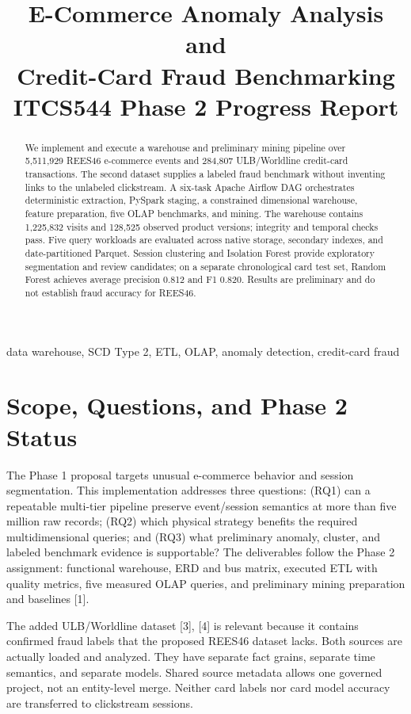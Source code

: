 \documentclass[conference]{IEEEtran}
\title{E-Commerce Anomaly Analysis and\\Credit-Card Fraud Benchmarking\\\large ITCS544 Phase 2 Progress Report}
\author{\IEEEauthorblockN{Khon Cho Thar Byin (6837922), Chuchan Ou (6836902), Aye Myo Myat (6837919)}\IEEEauthorblockA{Faculty of Information and Communication Technology, Mahidol University\\12 October 2026}}
\begin{document}
\maketitle
\begin{abstract}
We implement and execute a warehouse and preliminary mining pipeline over 5,511,929 REES46 e-commerce events and 284,807 ULB/Worldline credit-card transactions. The second dataset supplies a labeled fraud benchmark without inventing links to the unlabeled clickstream. A six-task Apache Airflow DAG orchestrates deterministic extraction, PySpark staging, a constrained dimensional warehouse, feature preparation, five OLAP benchmarks, and mining. The warehouse contains 1,225,832 visits and 128,525 observed product versions; integrity and temporal checks pass. Five query workloads are evaluated across native storage, secondary indexes, and date-partitioned Parquet. Session clustering and Isolation Forest provide exploratory segmentation and review candidates; on a separate chronological card test set, Random Forest achieves average precision 0.812 and F1 0.820. Results are preliminary and do not establish fraud accuracy for REES46.
\end{abstract}
\begin{IEEEkeywords}data warehouse, SCD Type 2, ETL, OLAP, anomaly detection, credit-card fraud\end{IEEEkeywords}

\section{Scope, Questions, and Phase 2 Status}
The Phase 1 proposal targets unusual e-commerce behavior and session segmentation. This implementation addresses three questions: (RQ1) can a repeatable multi-tier pipeline preserve event/session semantics at more than five million raw records; (RQ2) which physical strategy benefits the required multidimensional queries; and (RQ3) what preliminary anomaly, cluster, and labeled benchmark evidence is supportable? The deliverables follow the Phase 2 assignment: functional warehouse, ERD and bus matrix, executed ETL with quality metrics, five measured OLAP queries, and preliminary mining preparation and baselines [1].

The added ULB/Worldline dataset [3], [4] is relevant because it contains confirmed fraud labels that the proposed REES46 dataset lacks. Both sources are actually loaded and analyzed. They have separate fact grains, separate time semantics, and separate models. Shared source metadata allows one governed project, not an entity-level merge. Neither card labels nor card model accuracy are transferred to clickstream sessions.
\end{document}
